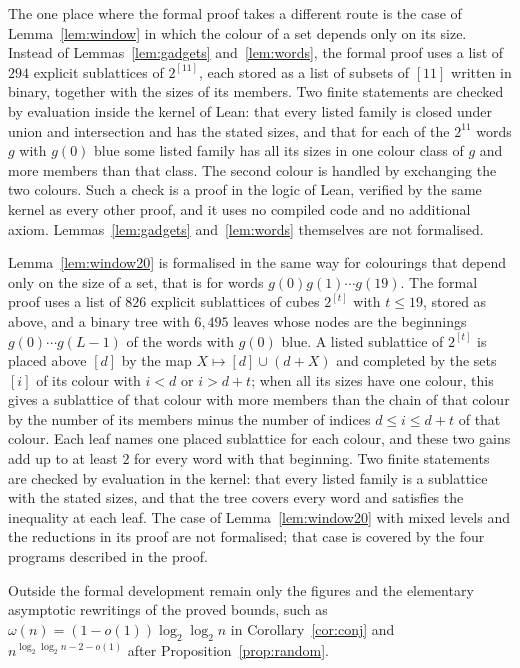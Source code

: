 \documentclass[11pt,reqno]{amsart}
\numberwithin{equation}{section}
\theoremstyle{plain}
\theoremstyle{definition}
\theoremstyle{remark}
\begin{document}
The one place where the formal proof takes a different route is the case
of Lemma~\ref{lem:window} in which the colour of a set depends only on its
size. Instead of Lemmas~\ref{lem:gadgets} and~\ref{lem:words}, the formal
proof uses a list of $294$ explicit sublattices of $2^{[11]}$, each stored
as a list of subsets of $[11]$ written in binary, together with the sizes
of its members. Two finite statements are checked by evaluation inside
the kernel of Lean: that every listed family is closed under union and
intersection and has the stated sizes, and that for each of the $2^{11}$
words $g$ with $g(0)$ blue some listed family has all its sizes in one
colour class of $g$ and more members than that class. The second colour is
handled by exchanging the two colours. Such a check is a proof in the
logic of Lean, verified by the same kernel as every other proof, and it
uses no compiled code and no additional axiom. Lemmas~\ref{lem:gadgets}
and~\ref{lem:words} themselves are not formalised.

Lemma~\ref{lem:window20} is formalised in the same way for colourings
that depend only on the size of a set, that is for words
$g(0)g(1)\cdots g(19)$. The formal proof uses a list of $826$ explicit
sublattices of cubes $2^{[t]}$ with $t\le19$, stored as above, and a
binary tree with $6{,}495$ leaves whose nodes are the beginnings
$g(0)\cdots g(L-1)$ of the words with $g(0)$ blue. A listed sublattice of
$2^{[t]}$ is placed above $[d]$ by the map $X\mapsto[d]\cup(d+X)$ and
completed by the sets $[i]$ of its colour with $i<d$ or $i>d+t$; when all
its sizes have one colour, this gives a sublattice of that colour with
more members than the chain of that colour by the number of its members
minus the number of indices $d\le i\le d+t$ of that colour. Each leaf
names one placed sublattice for each colour, and these two gains add up
to at least $2$ for every word with that beginning. Two finite statements
are checked by evaluation in the kernel: that every listed family is a
sublattice with the stated sizes, and that the tree covers every word and
satisfies the inequality at each leaf. The case of
Lemma~\ref{lem:window20} with mixed levels and the reductions in its
proof are not formalised; that case is covered by the four programs
described in the proof.

Outside the formal development remain only the figures and
the elementary asymptotic rewritings of the proved bounds, such as
$\omega(n)=(1-o(1))\log_2\log_2n$ in Corollary~\ref{cor:conj} and
$n^{\log_2\log_2n-2-o(1)}$ after Proposition~\ref{prop:random}.
\end{document}

